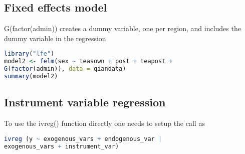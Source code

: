\subsection {Fixed effects model} \label {r: fem}
G(factor(admin)) creates a dummy variable, one per region, and includes the dummy variable
in the regression
\begin{lstlisting}[language=R]
library("lfe")
model2 <- felm(sex ~ teasown + post + teapost + 
G(factor(admin)), data = qiandata)
summary(model2)
\end{lstlisting}

\subsection {Instrument variable regression}
To use the ivreg() function directly one needs to setup the call as
\begin{lstlisting}[language=R]
ivreg (y ~ exogenous_vars + endogenous_var | 
exogenous_vars + instrument_var)
\end{lstlisting}
